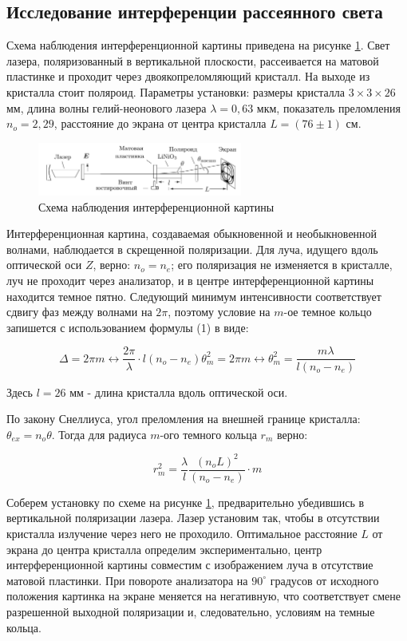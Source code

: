 \documentclass[12pt]{kiarticle}
\begin{document}
	\subsection{Исследование интерференции рассеянного света}
	
	Схема наблюдения интерференционной картины приведена на рисунке \ref{shema}. Свет лазера, поляризованный в вертикальной плоскости, рассеивается на матовой пластинке и проходит через двоякопреломляющий кристалл. На выходе из кристалла стоит поляроид. Параметры установки: размеры кристалла $3 \times 3 \times 26$ мм, длина волны гелий-неонового лазера $\lambda = 0,63$ мкм, показатель преломления $n_o = 2,29$, расстояние до экрана от центра кристалла $L = (76 \pm 1)$ см. 
	
	\begin{figure}[h]
		\centering	
		\includegraphics[width=0.6\textwidth]{shema.png}
		\caption{Схема наблюдения интерференционной картины}
		\label{shema}
	\end{figure}
	
	Интерференционная картина, создаваемая обыкновенной и необыкновенной волнами, наблюдается в скрещенной поляризации. Для луча, идущего вдоль оптической оси $Z$, верно: $n_o = n_e$; его поляризация не изменяется в кристалле, луч не проходит через анализатор, и в центре интерференционной картины находится темное пятно. Следующий минимум интенсивности соответствует сдвигу фаз между волнами на $2\pi$, поэтому условие на $m$-ое темное кольцо запишется с использованием формулы (1) в виде:
	
	\[ \Delta = 2\pi m \leftrightarrow \frac{2\pi}{\lambda}\cdot l (n_o - n_e)\theta_m^2 = 2\pi m \leftrightarrow \theta_m^2 = \frac{m\lambda}{l(n_o - n_e)} \] 
	
	Здесь $l = 26$ мм - длина кристалла вдоль оптической оси.
	
	По закону Снеллиуса, угол преломления на внешней границе кристалла: $\theta_{ex} = n_o\theta$. Тогда для радиуса $m$-ого темного кольца $r_m$ верно: 

	\begin{equation}	
		r_m^2 = \frac{\lambda}{l} \frac{(n_oL)^2}{(n_o - n_e)} \cdot m
	\end{equation}
	
	Соберем установку по схеме на рисунке \ref{shema}, предварительно убедившись в вертикальной поляризации лазера. Лазер установим так, чтобы в отсутствии кристалла излучение через него не проходило. Оптимальное расстояние $L$ от экрана до центра кристалла определим экспериментально, центр интерференционной картины совместим с изображением луча в отсутствие матовой пластинки. При повороте анализатора на $90^\circ$ градусов от исходного положения картинка на экране меняется на негативную, что соответствует смене разрешенной выходной поляризации и, следовательно, условиям на темные кольца. 
	
\end{document}
